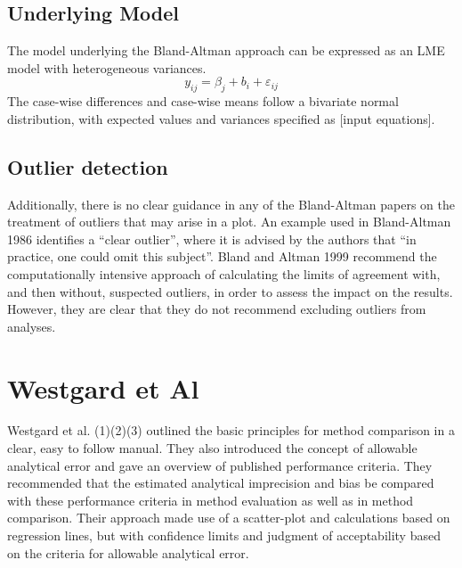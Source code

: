 \documentclass[12pt, a4paper]{report}
\theoremstyle{plain}
\theoremstyle{definition}
\theoremstyle{remark}
\begin{document}
\subsection{Underlying Model}
The model underlying the Bland-Altman approach can be expressed as an LME model with heterogeneous variances.
\[y_{ij} = \beta_j + b_i  + \varepsilon_{ij}\]
The case-wise differences and case-wise means follow a bivariate normal distribution, with expected values and variances specified as [input equations].
\subsection{Outlier detection}
Additionally, there is no clear guidance in any of the Bland-Altman papers on the treatment of outliers that may arise in a plot.
An example used in Bland-Altman 1986 identifies a “clear outlier”, where it is advised by the authors that “in practice, one could omit this subject”.
Bland and Altman 1999 recommend the computationally intensive approach of calculating the limits of agreement with, and then without, suspected outliers, in order to assess the impact on the results. However, they are clear that they do not recommend excluding outliers from analyses.

\section{Westgard et Al}
Westgard et al. (1)(2)(3) outlined the basic principles for method comparison in a clear, easy to follow manual. They also introduced the concept of allowable analytical error and gave an overview of published performance criteria. They recommended that the estimated analytical imprecision and bias be compared with these performance criteria in method evaluation as well as in method comparison. Their approach made use of a scatter-plot and calculations based on regression lines, but with confidence limits and judgment of acceptability based on the criteria for allowable analytical error.
\end{document}
